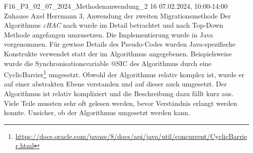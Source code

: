 \fieldnote
{F16\_P3\_02\_07\_2024\_Methodenanwendung\_2}
{16}
{07.02.2024, 10:00-14:00}
{Zuhause}
{Axel Herrmann}
{3, Anwendung der zweiten Migrationsmethode}
{
  Der Algorithmus \emph{cHAC} nach  wurde im Detail betrachtet und nach Top-Down Methode angefangen umzusetzen.
  Die Implementierung wurde in Java vorgenommen.
  Für gewisse Details des Pseudo-Codes wurden Java-spezifische Konstrukte verwendet statt der im Algorithmus angegebenen.
  Beispielsweise wurde die Synchronisationsvariable @SIC des Algorithmus durch eine CyclicBarrier\footnote{\url{https://docs.oracle.com/javase/8/docs/api/java/util/concurrent/CyclicBarrier.html}} umgesetzt.
}
{
}
{
  Obwohl der Algorithmus relativ komplex ist, wurde er auf einer abstrakten Ebene verstanden und auf dieser auch umgesetzt.
}
{
  Der Algorithmus ist relativ kompliziert und die Beschreibung dazu fällt kurz aus. Viele Teile mussten sehr oft gelesen werden, bevor Verständnis erlangt werden konnte.
}
{
  Unsicher, ob der Algorithmus umgesetzt werden kann.
}
